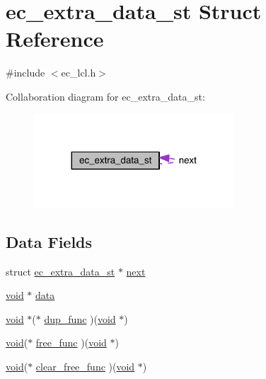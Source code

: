 \hypertarget{structec__extra__data__st}{}\section{ec\+\_\+extra\+\_\+data\+\_\+st Struct Reference}
\label{structec__extra__data__st}


{\ttfamily \#include $<$ec\+\_\+lcl.\+h$>$}



Collaboration diagram for ec\+\_\+extra\+\_\+data\+\_\+st\+:\nopagebreak
\begin{figure}[H]
\begin{center}
\leavevmode
\includegraphics[width=212pt]{structec__extra__data__st__coll__graph}
\end{center}
\end{figure}
\subsection*{Data Fields}
\begin{DoxyCompactItemize}
\item 
struct \hyperlink{structec__extra__data__st}{ec\+\_\+extra\+\_\+data\+\_\+st} $\ast$ \hyperlink{structec__extra__data__st_a21a2567e894c42945403b43433460032}{next}
\item 
\hyperlink{hw__4758__cca_8h_afad4d591c7931ff6dc5bf69c76c96aa0}{void} $\ast$ \hyperlink{structec__extra__data__st_a735984d41155bc1032e09bece8f8d66d}{data}
\item 
\hyperlink{hw__4758__cca_8h_afad4d591c7931ff6dc5bf69c76c96aa0}{void} $\ast$($\ast$ \hyperlink{structec__extra__data__st_a99a400c0f48769ab80d0cfd9dfed156a}{dup\+\_\+func} )(\hyperlink{hw__4758__cca_8h_afad4d591c7931ff6dc5bf69c76c96aa0}{void} $\ast$)
\item 
\hyperlink{hw__4758__cca_8h_afad4d591c7931ff6dc5bf69c76c96aa0}{void}($\ast$ \hyperlink{structec__extra__data__st_aa8cedfd81f841b27885884598e1fafcf}{free\+\_\+func} )(\hyperlink{hw__4758__cca_8h_afad4d591c7931ff6dc5bf69c76c96aa0}{void} $\ast$)
\item 
\hyperlink{hw__4758__cca_8h_afad4d591c7931ff6dc5bf69c76c96aa0}{void}($\ast$ \hyperlink{structec__extra__data__st_a08a1758f172b86592ffeee32b5faf83a}{clear\+\_\+free\+\_\+func} )(\hyperlink{hw__4758__cca_8h_afad4d591c7931ff6dc5bf69c76c96aa0}{void} $\ast$)
\end{DoxyCompactItemize}


